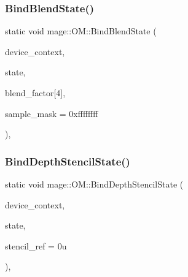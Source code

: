 \hypertarget{structmage_1_1_o_m_a1d28a8b67f3760107cfc4e8ae7fe78fa}{}\label{structmage_1_1_o_m_a1d28a8b67f3760107cfc4e8ae7fe78fa} 
\subsubsection{\texorpdfstring{Bind\+Blend\+State()}{BindBlendState()}\hspace{0.1cm}{\footnotesize\ttfamily [2/2]}}
{\footnotesize\ttfamily static void mage\+::\+O\+M\+::\+Bind\+Blend\+State (\begin{DoxyParamCaption}\item[{I\+D3\+D11\+Device\+Context2 $\ast$}]{device\+\_\+context,  }\item[{I\+D3\+D11\+Blend\+State $\ast$}]{state,  }\item[{const F\+L\+O\+AT}]{blend\+\_\+factor\mbox{[}4\mbox{]},  }\item[{U\+I\+NT}]{sample\+\_\+mask = {\ttfamily 0xffffffff} }\end{DoxyParamCaption})\hspace{0.3cm}{\ttfamily [static]}, {\ttfamily [noexcept]}}

\hypertarget{structmage_1_1_o_m_a14f6a3fcf0678bf2092d443b06b3a925}{}\label{structmage_1_1_o_m_a14f6a3fcf0678bf2092d443b06b3a925} 
\subsubsection{\texorpdfstring{Bind\+Depth\+Stencil\+State()}{BindDepthStencilState()}}
{\footnotesize\ttfamily static void mage\+::\+O\+M\+::\+Bind\+Depth\+Stencil\+State (\begin{DoxyParamCaption}\item[{I\+D3\+D11\+Device\+Context2 $\ast$}]{device\+\_\+context,  }\item[{I\+D3\+D11\+Depth\+Stencil\+State $\ast$}]{state,  }\item[{U\+I\+NT}]{stencil\+\_\+ref = {\ttfamily 0u} }\end{DoxyParamCaption})\hspace{0.3cm}{\ttfamily [static]}, {\ttfamily [noexcept]}}

\hypertarget{structmage_1_1_o_m_a6c031fe0e62dfee63463f05e3fb63f97}{}\label{structmage_1_1_o_m_a6c031fe0e62dfee63463f05e3fb63f97} 
